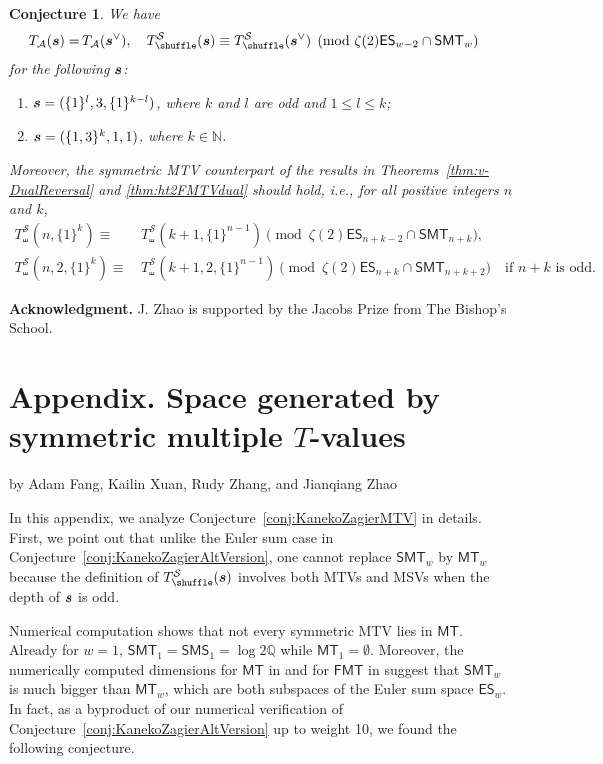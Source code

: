 \documentclass{article}
\newcommand{\FMTV}{\mathsf {FMT}}
\newcommand{\SMSV}{\mathsf {SMS}}
\newcommand{\ES}{\mathsf {ES}}
\newcommand{\MTV}{\mathsf {MT}}
\newcommand{\SMTV}{\mathsf {SMT}}
\newcommand{\sha}{\shuffle}
\newcommand{\Sy}{{\mathcal S}}
\newcommand{\bfs}{{\boldsymbol{\sl{s}}}}
\newcommand{\calA}{\mathcal{A}}
\newcommand{\N}{\mathbb{N}}
\newcommand{\Q}{\mathbb{Q}}
\theoremstyle{plain}
\newtheorem{conj}[thm]{Conjecture}
\theoremstyle{definition}
\begin{document}
\begin{conj}\label{conj:allDuals}
We have
\begin{align*}
T_\calA(\bfs)=&\, T_\calA(\bfs^\vee),\quad  T_\sha^\Sy(\bfs)\equiv T_\sha^\Sy(\bfs^\vee) \pmod{\zeta(2)\ES_{w-2}\cap \SMTV_{w}}
\end{align*}
for the following $\bfs$:
\begin{enumerate}
    \item [\upshape{(1)}] $\bfs=(\{1\}^l,3,\{1\}^{k-l})$, where $k$ and $l$ are odd and $1\le l\le k$;
    \item [\upshape{(2)}] $\bfs=(\{1,3\}^k,1,1)$, where $k\in\N$.
\end{enumerate}
Moreover, the symmetric MTV counterpart of the results in Theorems~\ref{thm:v-DualReversal} and \ref{thm:ht2FMTVdual} should hold, i.e., for all positive integers $n$ and $k$,
\begin{align*}
T_\sha^\Sy(n,\{1\}^{k})\equiv&\, T_\sha^\Sy(k+1,\{1\}^{n-1}) \pmod{\zeta(2)\ES_{n+k-2}\cap \SMTV_{n+k}},\\
T_\sha^\Sy(n,2,\{1\}^{k})\equiv &\, T_\sha^\Sy(k+1,2,\{1\}^{n-1}) \pmod{\zeta(2)\ES_{n+k}\cap \SMTV_{n+k+2}} \quad\text{if $n+k$ is odd}.
\end{align*}

\end{conj}

\bigskip
\noindent
\textbf{Acknowledgment.} J. Zhao is supported by the Jacobs Prize from The Bishop's School.


\section*{Appendix. Space generated by symmetric multiple $T$-values}
\begin{center}
   {\large by Adam Fang, Kailin Xuan, Rudy Zhang, and Jianqiang Zhao}
\end{center}

In this appendix, we analyze Conjecture~\ref{conj:KanekoZagierMTV} in details. First,
we point out that unlike the Euler sum case in Conjecture~\ref{conj:KanekoZagierAltVersion}, one cannot replace $\SMTV_w$ by $\MTV_{w}$ because the definition of $T_\sha^\Sy(\bfs)$ involves both MTVs and MSVs when the depth of $\bfs$ is odd.

Numerical computation shows that not every symmetric MTV lies in $\MTV$. Already for $w=1$, $\SMTV_1=\SMSV_1= \log 2 \Q$ while $\MTV_1=\emptyset$. Moreover, the numerically computed dimensions for $\MTV$ in \cite{KanekoTs2020} and for $\FMTV$ in \cite{Zhao2024a} suggest that $\SMTV_w$ is much bigger than $\MTV_w$, which are both subspaces of the Euler sum space $\ES_w$. In fact, as a byproduct of our numerical verification of Conjecture~\ref{conj:KanekoZagierAltVersion} up to weight 10, we found the following conjecture.
\end{document}
